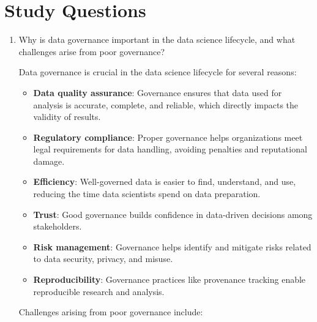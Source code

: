\documentclass[12pt]{article}
\begin{document}
\section{Study Questions}

\begin{enumerate}
    \item Why is data governance important in the data science lifecycle, and what challenges arise from poor governance?
    
    \begin{tcolorbox}[colback=blue!5!white,colframe=blue!75!black,title={Solution}]
    Data governance is crucial in the data science lifecycle for several reasons:
    
    \begin{itemize}
        \item \textbf{Data quality assurance}: Governance ensures that data used for analysis is accurate, complete, and reliable, which directly impacts the validity of results.
        
        \item \textbf{Regulatory compliance}: Proper governance helps organizations meet legal requirements for data handling, avoiding penalties and reputational damage.
        
        \item \textbf{Efficiency}: Well-governed data is easier to find, understand, and use, reducing the time data scientists spend on data preparation.
        
        \item \textbf{Trust}: Good governance builds confidence in data-driven decisions among stakeholders.
        
        \item \textbf{Risk management}: Governance helps identify and mitigate risks related to data security, privacy, and misuse.
        
        \item \textbf{Reproducibility}: Governance practices like provenance tracking enable reproducible research and analysis.
    \end{itemize}
    
    Challenges arising from poor governance include:
    

\end{tcolorbox}
\end{enumerate}
\end{document}
